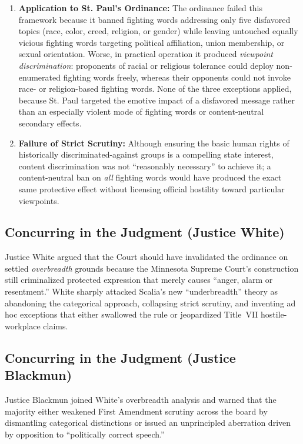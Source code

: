 \documentclass[12pt]{article}
\begin{document}
\begin{enumerate}
  \item \textbf{Application to St. Paul's Ordinance:} The ordinance failed this framework because it banned fighting words addressing only five disfavored topics (race, color, creed, religion, or gender) while leaving untouched equally vicious fighting words targeting political affiliation, union membership, or sexual orientation. Worse, in practical operation it produced \textit{viewpoint discrimination}: proponents of racial or religious tolerance could deploy non-enumerated fighting words freely, whereas their opponents could not invoke race- or religion-based fighting words. None of the three exceptions applied, because St. Paul targeted the emotive impact of a disfavored message rather than an especially violent mode of fighting words or content-neutral secondary effects.
  \item \textbf{Failure of Strict Scrutiny:} Although ensuring the basic human rights of historically discriminated-against groups is a compelling state interest, content discrimination was not ``reasonably necessary'' to achieve it; a content-neutral ban on \textit{all} fighting words would have produced the exact same protective effect without licensing official hostility toward particular viewpoints.
\end{enumerate}

\subsection{Concurring in the Judgment (Justice White)}

Justice White argued that the Court should have invalidated the ordinance on settled \textit{overbreadth} grounds because the Minnesota Supreme Court's construction still criminalized protected expression that merely causes ``anger, alarm or resentment.'' White sharply attacked Scalia's new ``underbreadth'' theory as abandoning the categorical approach, collapsing strict scrutiny, and inventing ad hoc exceptions that either swallowed the rule or jeopardized Title~VII hostile-workplace claims.

\subsection{Concurring in the Judgment (Justice Blackmun)}

Justice Blackmun joined White's overbreadth analysis and warned that the majority either weakened First Amendment scrutiny across the board by dismantling categorical distinctions or issued an unprincipled aberration driven by opposition to ``politically correct speech.''
\end{document}
